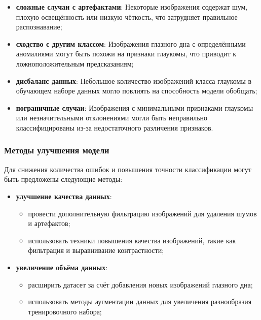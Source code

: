 {    \begin{itemize}
        \item \textbf{сложные случаи с артефактами}: Некоторые изображения содержат шум, плохую освещённость или низкую чёткость, что затрудняет правильное распознавание;
        \item \textbf{сходство с другим классом}: Изображения глазного дна с определёнными аномалиями могут быть похожи на признаки глаукомы, что приводит к ложноположительным предсказаниям;
        \item \textbf{дисбаланс данных}: Небольшое количество изображений класса глаукомы в обучающем наборе данных могло повлиять на способность модели обобщать;
        \item \textbf{пограничные случаи}: Изображения с минимальными признаками глаукомы или незначительными отклонениями могли быть неправильно классифицированы из-за недостаточного различения признаков.
    \end{itemize}

    \subsubsection*{Методы улучшения модели}

    Для снижения количества ошибок и повышения точности классификации могут быть предложены следующие методы:

    \begin{itemize}
        \item \textbf{улучшение качества данных}:
        \begin{itemize}
            \item провести дополнительную фильтрацию изображений для удаления шумов и артефактов;
            \item использовать техники повышения качества изображений, такие как фильтрация и выравнивание контрастности;
        \end{itemize}
        
        \item \textbf{увеличение объёма данных}:
        \begin{itemize}
            \item расширить датасет за счёт добавления новых изображений глазного дна;
            \item использовать методы аугментации данных для увеличения разнообразия тренировочного набора;
        \end{itemize}
        

\end{itemize}}

